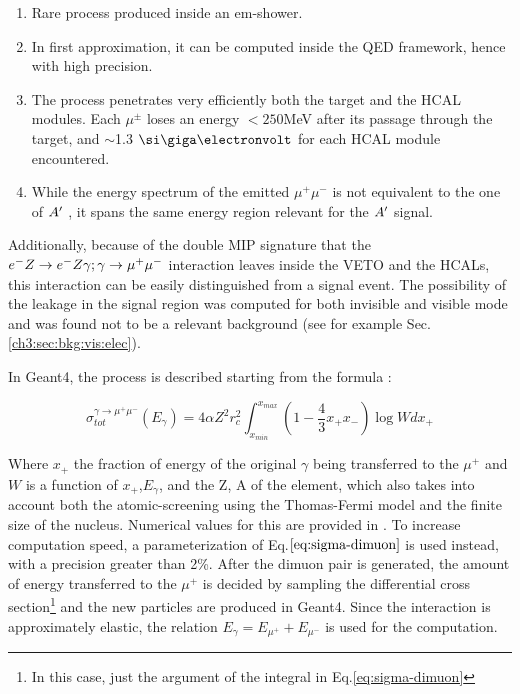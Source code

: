 \begin{enumerate}
\item Rare process produced inside an em-shower.
\item In first approximation, it can be computed inside the QED framework, hence with high precision.
\item The process penetrates very efficiently both the target and the HCAL modules. Each $\mu^{\pm}$ loses an energy $<250$\si{\mega\electronvolt} after its passage through the target, and $\sim$1.3 $\gev$ for each HCAL module encountered. 
\item While the energy spectrum of the emitted $\mu^+\mu^-$ is not equivalent to the one of $A'$ \cite{dimuon-mc}, it spans the same energy region relevant for the $A'$ signal.
\end{enumerate}

Additionally, because of the double MIP signature that the $e^- Z \to e^- Z \gamma; \gamma \to \mu^+ \mu^-$ interaction leaves inside the VETO and the HCALs, this interaction can be easily distinguished from a signal event. The possibility of the leakage in the signal region was computed for both invisible and visible mode and was found not to be a relevant background (see for example Sec.\ref{ch3:sec:bkg:vis:elec}).

In Geant4, the process is described starting from the formula \cite{dimuon-mc}:

\begin{equation}
  \label{eq:sigma-dimuon}
  \sigma_{tot}^{\gamma \to \mu^+ \mu^-}(E_{\gamma}) = 4\alpha Z^2 r^2_c\int^{x_{max}}_{x_{min}} \left(1 - \frac{4}{3}x_+x_- \right) \log{W}dx_+
\end{equation}

Where $x_+$ the fraction of energy of the original $\gamma$ being transferred to the $\mu^+$ and $W$ is a function of $x_+$,$E_{\gamma}$, and the Z, A of the element, which also takes into account both the atomic-screening using the Thomas-Fermi model and the finite size of the nucleus. Numerical values for this are provided in \cite{dimuon-mc}. To increase computation speed, a parameterization of Eq.$\ref{eq:sigma-dimuon}$ is used instead, with a precision greater than 2\%. After the dimuon pair is generated, the amount of energy transferred to the $\mu^+$ is decided by sampling the differential cross section\footnote{In this case, just the argument of the integral in Eq.\ref{eq:sigma-dimuon}} and the new particles are produced in Geant4. Since the interaction is approximately elastic, the relation $E_{\gamma} = E_{\mu^+} + E_{\mu^-}$ is used for the computation.


